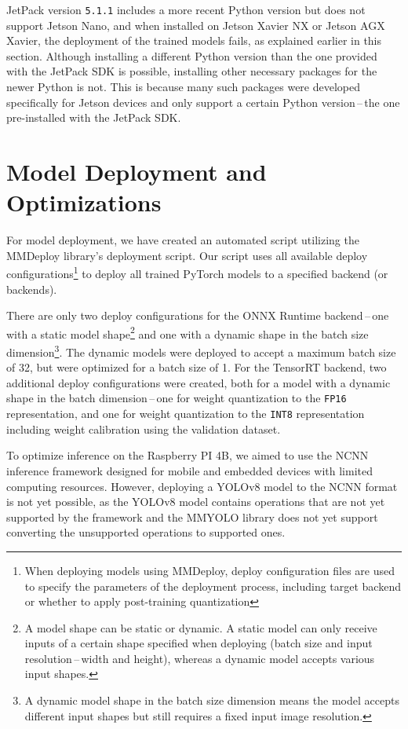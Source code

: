 JetPack version \texttt{5.1.1} includes a more recent Python version but does
not support Jetson Nano, and when installed on Jetson Xavier NX or Jetson AGX
Xavier, the deployment of the trained models fails, as explained earlier in this
section. Although installing a different Python version than the one provided
with the JetPack SDK is possible, installing other necessary packages for the
newer Python is not. This is because many such packages were developed
specifically for Jetson devices and only support a certain Python
version\,--\,the one pre-installed with the JetPack SDK.


\section{Model Deployment and Optimizations}


For model deployment, we have created an automated script utilizing the MMDeploy
library's deployment script. Our script uses all available deploy
configurations\footnote{When deploying models using MMDeploy, deploy
configuration files are used to specify the parameters of the deployment process,
including target backend or whether to apply post-training quantization} to
deploy all trained PyTorch models to a specified backend (or backends).

There are only two deploy configurations for the ONNX Runtime backend\,--\,one
with a static model shape\footnote{A model shape can be static or dynamic. A
static model can only receive inputs of a certain shape specified when deploying
(batch size and input resolution\,--\,width and height), whereas a dynamic model
accepts various input shapes.} and one with a dynamic shape in the batch size
dimension\footnote{A dynamic model shape in the batch size dimension means the
model accepts different input shapes but still requires a fixed input image
resolution.}. The dynamic models were deployed to accept a maximum batch size of
32, but were optimized for a batch size of 1.  For the TensorRT backend, two
additional deploy configurations were created, both for a model with a dynamic
shape in the batch dimension\,--\,one for weight quantization to the
\texttt{FP16} representation, and one for weight quantization to the
\texttt{INT8} representation including weight calibration using the validation
dataset.

To optimize inference on the Raspberry PI 4B, we aimed to use the NCNN inference
framework designed for mobile and embedded devices with limited computing
resources. However, deploying a YOLOv8 model to the NCNN format is not yet
possible, as the YOLOv8 model contains operations that are not yet supported by
the framework and the MMYOLO library does not yet support converting the
unsupported operations to supported ones.


